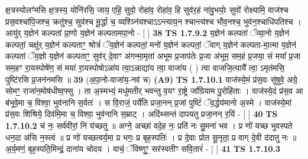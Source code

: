 \documentclass[17pt]{extarticle}
\begin{document}
                  क्ष॒त्रस्योलꣳ॑मसि क्ष॒त्रस्य॒ योनि॑रसि॒ जाय॒ एहि॒ सुवो॒ रोहा॑व॒ रोहा॑व॒ हि सुव॑र॒हं ना॑वु॒भयोः॒ सुवो॑ रोक्ष्यामि॒ वाज॑श्च प्रस॒वश्चा॑पि॒जश्च॒ क्रतु॑श्च॒ सुव॑श्च मू॒र्द्धा च॒ व्यश्ञ्नि॑यश्चाऽऽन्त्याय॒न श्चान्त्य॑श्च भौव॒नश्च॒ भुव॑न॒श्चाधि॑पतिश्च । आयु॑र् य॒ज्ञेन॑ कल्पतां प्रा॒णो य॒ज्ञेन॑ कल्पतामपा॒नो - [ ] \textbf{  38} \newline
                  \newline
                                \textbf{ TS 1.7.9.2} \newline
                  य॒ज्ञेन॑ कल्पतां ॅव्या॒नो य॒ज्ञेन॑ कल्पतां॒ चक्षु॑र् य॒ज्ञेन॑ कल्पताꣳ॒॒ श्रोत्रं॑ ॅय॒ज्ञेन॑ कल्पतां॒ मनो॑ य॒ज्ञेन॑ कल्पतां॒ ॅवाग् य॒ज्ञेन॑ कल्पता-मा॒त्मा य॒ज्ञेन॑ कल्पतां ॅय॒ज्ञो य॒ज्ञेन॑ कल्पताꣳ॒॒ सुव॑र् दे॒वाꣳ अ॑गन्मा॒मृता॑ अभूम प्र॒जाप॑तेः प्र॒जा अ॑भूम॒ सम॒हं प्र॒जया॒ सं मया᳚ प्र॒जा सम॒हꣳ रा॒यस्पोषे॑ण॒ सं मया॑ रा॒यस्पोषोऽन्ना॑य त्वा॒ऽन्नाद्या॑य त्वा॒ वाजा॑य ( ) त्वा वाजजि॒त्यायै᳚ त्वा॒ ऽमृत॑मसि॒ पुष्टि॑रसि प्र॒जन॑नमसि ॥ \textbf{  39 } \newline
                  \newline
                      (अ॒पा॒नो-वाजा॑य॒-नव॑ च)  \textbf{(A9)} \newline \newline
                                        \textbf{ TS 1.7.10.1} \newline
                  वाज॑स्ये॒मं प्र॑स॒वः सु॑षुवे॒ अग्रे॒ सोमꣳ॒॒ राजा॑न॒मोष॑धीष्व॒फ्सु । ता अ॒स्मभ्यं॒ मधु॑मतीर् भवन्तु व॒यꣳ रा॒ष्ट्रे जा᳚ग्रियाम पु॒रोहि॑ताः । वाज॑स्ये॒दं प्र॑स॒व आ ब॑भूवे॒मा च॒ विश्वा॒ भुव॑नानि स॒र्वतः॑ । स वि॒राजं॒ पर्ये॑ति प्रजा॒नन् प्र॒जां पुष्टिं॑ ॅव॒र्द्धय॑मानो अ॒स्मे । वाज॑स्ये॒मां प्र॑स॒वः शि॑श्रिये॒ दिव॑मि॒मा च॒ विश्वा॒ भुव॑नानि स॒म्राट् । अदि॑थ्सन्तं दापयतु प्रजा॒नन् र॒यिं - [ ] \textbf{  40} \newline
                  \newline
                                \textbf{ TS 1.7.10.2} \newline
                  च॑ नः॒ सर्व॑वीरां॒ नि य॑च्छतु ॥ अग्ने॒ अच्छा॑ वदे॒ह नः॒ प्रति॑ नः सु॒मना॑ भव । प्र णो॑ यच्छ भुवस्पते धन॒दा अ॑सि न॒स्त्वं ॥ प्र णो॑ यच्छत्वर्य॒मा प्र भगः॒ प्र बृह॒स्पतिः॑ । प्र दे॒वाः प्रोत सू॒नृता॒ प्र वाग् दे॒वी द॑दातु नः ॥ अ॒र्य॒मणं॒ बृह॒स्पति॒मिन्द्रं॒ दाना॑य चोदय । वाचं॒ ॅविष्णुꣳ॒॒ सर॑स्वतीꣳ सवि॒तारं॑ - [ ] \textbf{  41} \newline
                  \newline
                                \textbf{ TS 1.7.10.3} \newline
\end{document}
